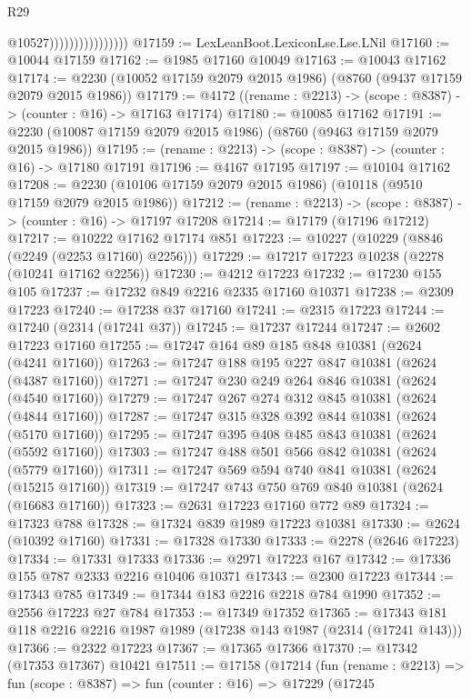 \begin{lexlean}{R29}
\begin{coremodule}
                                    @10527))))))))))))))))
@17159 := LexLeanBoot.LexiconLse.Lse.LNil
@17160 := @10044 @17159
@17162 := @1985 @17160 @10049
@17163 := @10043 @17162
@17174 := @2230 (@10052 @17159 @2079 @2015 @1986) (@8760 (@9437 @17159 @2079 @2015 @1986))
@17179 := @4172 ((rename : @2213) -> (scope : @8387) -> (counter : @16) -> @17163 @17174)
@17180 := @10085 @17162
@17191 := @2230 (@10087 @17159 @2079 @2015 @1986) (@8760 (@9463 @17159 @2079 @2015 @1986))
@17195 := (rename : @2213) -> (scope : @8387) -> (counter : @16) -> @17180 @17191
@17196 := @4167 @17195
@17197 := @10104 @17162
@17208 := @2230 (@10106 @17159 @2079 @2015 @1986) (@10118 (@9510 @17159 @2079 @2015 @1986))
@17212 := (rename : @2213) -> (scope : @8387) -> (counter : @16) -> @17197 @17208
@17214 := @17179 (@17196 @17212)
@17217 := @10222 @17162 @17174 @851
@17223 := @10227 (@10229 (@8846 (@2249 (@2253 @17160) @2256)))
@17229 := @17217 @17223 @10238 (@2278 (@10241 @17162 @2256))
@17230 := @4212 @17223
@17232 := @17230 @155 @105
@17237 := @17232 @849 @2216 @2335 @17160 @10371
@17238 := @2309 @17223
@17240 := @17238 @37 @17160
@17241 := @2315 @17223
@17244 := @17240 (@2314 (@17241 @37))
@17245 := @17237 @17244
@17247 := @2602 @17223 @17160
@17255 := @17247 @164 @89 @185 @848 @10381 (@2624 (@4241 @17160))
@17263 := @17247 @188 @195 @227 @847 @10381 (@2624 (@4387 @17160))
@17271 := @17247 @230 @249 @264 @846 @10381 (@2624 (@4540 @17160))
@17279 := @17247 @267 @274 @312 @845 @10381 (@2624 (@4844 @17160))
@17287 := @17247 @315 @328 @392 @844 @10381 (@2624 (@5170 @17160))
@17295 := @17247 @395 @408 @485 @843 @10381 (@2624 (@5592 @17160))
@17303 := @17247 @488 @501 @566 @842 @10381 (@2624 (@5779 @17160))
@17311 := @17247 @569 @594 @740 @841 @10381 (@2624 (@15215 @17160))
@17319 := @17247 @743 @750 @769 @840 @10381 (@2624 (@16683 @17160))
@17323 := @2631 @17223 @17160 @772 @89
@17324 := @17323 @788
@17328 := @17324 @839 @1989 @17223 @10381
@17330 := @2624 (@10392 @17160)
@17331 := @17328 @17330
@17333 := @2278 (@2646 @17223)
@17334 := @17331 @17333
@17336 := @2971 @17223 @167
@17342 := @17336 @155 @787 @2333 @2216 @10406 @10371
@17343 := @2300 @17223
@17344 := @17343 @785
@17349 := @17344 @183 @2216 @2218 @784 @1990
@17352 := @2556 @17223 @27 @784
@17353 := @17349 @17352
@17365 := @17343 @181 @118 @2216 @2216 @1987 @1989 (@17238 @143 @1987 (@2314 (@17241 @143)))
@17366 := @2322 @17223
@17367 := @17365 @17366
@17370 := @17342 (@17353 @17367) @10421
@17511 := @17158
    (@17214
      (fun (rename : @2213) =>
      fun (scope : @8387) =>
      fun (counter : @16) =>
      @17229
        (@17245

\end{coremodule}
\end{lexlean}
